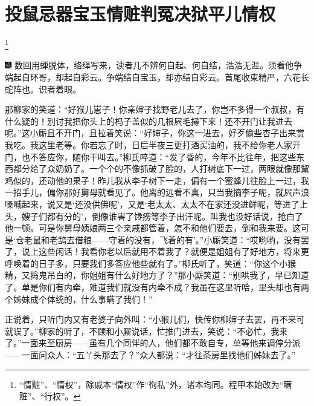 

\chapter{投鼠忌器宝玉情赃\hspace{.5em}判冤决狱平儿情权}\footnote{“情赃”、“情权”，除戚本“情权”作“徇私”外，诸本均同。程甲本始改为“瞒赃”、“行权”。}

{\includegraphics[width=3mm]{../Images/00005} \kaishu 数回用蝉脱体，络绎写来，读者几不辨何自起、何自结，浩浩无涯。须看他争端起自环哥，却起自彩云。争端结自宝玉，却亦结自彩云。首尾收束精严，六花长蛇阵也。识者着眼。}

那柳家的笑道：“好猴儿崽子！你亲婶子找野老儿去了，你岂不多得一个叔叔，有什么疑的！别讨我把你头上的杩子盖似的几根屄毛撏下来！还不开门让我进去呢。”这小厮且不开门，且拉着笑说：“好婶子，你这一进去，好歹偷些杏子出来赏我吃。我这里老等。你若忘了时，日后半夜三更打酒买油的，我不给你老人家开门，也不答应你，随你干叫去。”柳氏啐道：“发了昏的，今年不比往年，把这些东西都分给了众奶奶了。一个个的不像抓破了脸的，人打树底下一过，两眼就像那黧鸡似的，还动他的果子！昨儿我从李子树下一走，偏有一个蜜蜂儿往脸上一过，我一招手儿，偏你那好舅母就看见了。他离的远看不真，只当我摘李子呢，就屄声浪嗓喊起来，说又是‘还没供佛呢’，又是‘老太太、太太不在家还没进鲜呢，等进了上头，嫂子们都有分的’，倒像谁害了馋痨等李子出汗呢。叫我也没好话说，抢白了他一顿。可是你舅母姨娘两三个亲戚都管着，怎不和他们要去，倒和我来要。这可是‘仓老鼠和老鸹去借粮------守着的没有，飞着的有’。”小厮笑道：“哎哟哟，没有罢了，说上这些闲话！我看你老以后就用不着我了？就便是姐姐有了好地方，将来更呼唤着的日子多，只要我们多答应他些就有了。”柳氏听了，笑道：“你这个小猴精，又捣鬼吊白的，你姐姐有什么好地方了？”那小厮笑道：“别哄我了，早已知道了。单是你们有内牵，难道我们就没有内牵不成？我虽在这里听哈，里头却也有两个姊妹成个体统的，什么事瞒了我们！”

正说着，只听门内又有老婆子向外叫：“小猴儿们，快传你柳婶子去罢，再不来可就误了。”柳家的听了，不顾和小厮说话，忙推门进去，笑说：“不必忙，我来了。”一面来至厨房------虽有几个同伴的人，他们都不敢自专，单等他来调停分派------一面问众人：“五丫头那去了？”众人都说：“才往茶房里找他们姊妹去了。”

